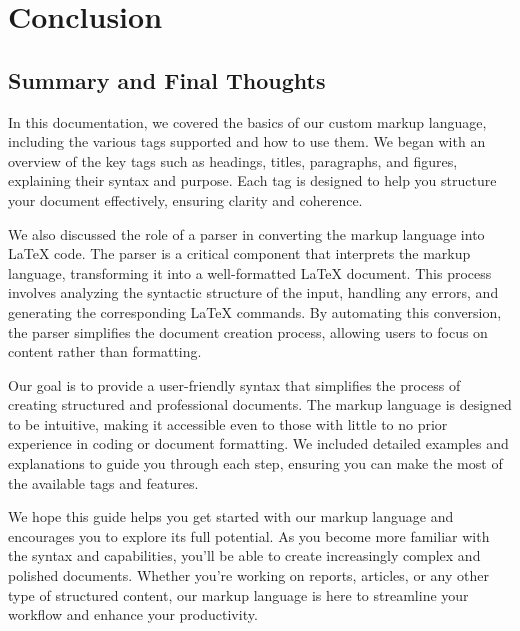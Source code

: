 \documentclass[oneside]{book}
\begin{document}
\newpage
\chapter{Conclusion}
\section{Summary and Final Thoughts}
In this documentation, we covered the basics of our custom markup language, including the various tags supported and how to use them. We began with an overview
            of the key tags such as headings, titles, paragraphs, and figures, explaining their syntax and purpose. Each tag is designed to help you structure your document
            effectively, ensuring clarity and coherence.\par
We also discussed the role of a parser in converting the markup language into LaTeX code. The parser is a critical component that interprets the markup language,
            transforming it into a well-formatted LaTeX document. This process involves analyzing the syntactic structure of the input, handling any errors, and generating 
            the corresponding LaTeX commands. By automating this conversion, the parser simplifies the document creation process, allowing users to focus on content rather than formatting.\par
Our goal is to provide a user-friendly syntax that simplifies the process of creating structured and professional documents. The markup language is designed to be intuitive, making it accessible even to those with little to no prior experience in coding or document formatting. We included detailed examples and explanations to guide you through each step, ensuring you can make the most of the available tags and features.\par
We hope this guide helps you get started with our markup language and encourages you to explore its full potential. As you become more familiar with the syntax and capabilities, you'll be able to create increasingly complex and polished documents. Whether you're working on reports, articles, or any other type of structured content, our markup language is here to streamline your workflow and enhance your productivity.\par

\newpage
\end{document}
